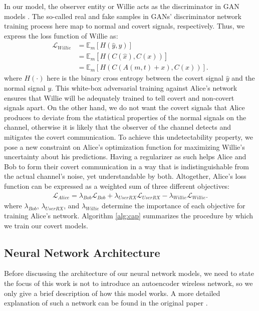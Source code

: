 In our model, the observer entity or Willie acts as the discriminator in GAN models \cite{goodfellow2014generative}. The so-called real and fake samples in GANs' discriminator network training process here map to normal and covert signals, respectively. Thus, we express the loss function of Willie as:
\begin{equation}
	\begin{aligned} \label{willie_loss}
	\mathcal{L}_{Willie} & = \mathbb{E}_{m}[H(\hat{y}, y)] \\
	& = \mathbb{E}_{m}[H(C(\hat{x}), C(x))] \\
	& = \mathbb{E}_{m}[H(C(A(m,t) + x), C(x))].
	\end{aligned}
\end{equation}
where \(H(\cdot)\) here is the binary cross entropy between the covert signal \(\hat{y}\) and the normal signal \(y\). This white-box adversarial training against Alice's network ensures that Willie will be adequately trained to tell covert and non-covert signals apart. On the other hand, we do not want the covert signals that Alice produces to deviate from the statistical properties of the normal signals on the channel, otherwise it is likely that the observer of the channel detects and mitigates the covert communication. To achieve this undetectability property, we pose a new constraint on Alice's optimization function for maximizing Willie's uncertainty about his predictions. Having a regularizer as such helps Alice and Bob to form their covert communication in a way that is indistinguishable from the actual channel's noise, yet understandable by both. Altogether, Alice's loss function can be expressed as a weighted sum of three different objectives:
\begin{equation}
	\begin{array}{l} \label{alice_loss}
	\mathcal{L}_{Alice} = \lambda_{Bob} \mathcal{L}_{Bob} + \lambda_{UserRX} \mathcal{L}_{UserRX} - \lambda_{Willie} \mathcal{L}_{Willie}.
\end{array}
\end{equation}
where \(\lambda_{Bob}\), \(\lambda_{UserRX}\), and \(\lambda_{Willie}\) determine the importance of each objective for training Alice's network. Algorithm \ref{alg:cap} summarizes the procedure by which we train our covert models.

\subsection{Neural Network Architecture}
Before discussing the architecture of our neural network models, we need to state the focus of this work is not to introduce an autoencoder wireless network, so we only give a brief description of how this model works. A more detailed explanation of such a network can be found in the original paper \cite{o2017introduction}.


